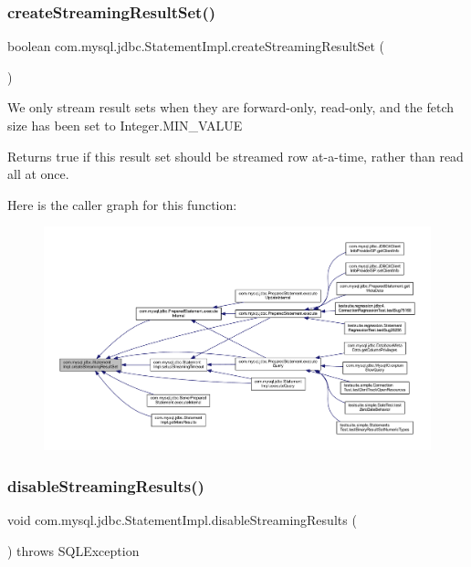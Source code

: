 \subsubsection{\texorpdfstring{create\+Streaming\+Result\+Set()}{createStreamingResultSet()}}
{\footnotesize\ttfamily boolean com.\+mysql.\+jdbc.\+Statement\+Impl.\+create\+Streaming\+Result\+Set (\begin{DoxyParamCaption}{ }\end{DoxyParamCaption})\hspace{0.3cm}{\ttfamily [protected]}}

We only stream result sets when they are forward-\/only, read-\/only, and the fetch size has been set to Integer.\+M\+I\+N\+\_\+\+V\+A\+L\+UE

\begin{DoxyReturn}{Returns}
true if this result set should be streamed row at-\/a-\/time, rather than read all at once. 
\end{DoxyReturn}
Here is the caller graph for this function\+:
\nopagebreak
\begin{figure}[H]
\begin{center}
\leavevmode
\includegraphics[width=350pt]{classcom_1_1mysql_1_1jdbc_1_1_statement_impl_a642ade7ecee90913b8de38602c43ce20_icgraph}
\end{center}
\end{figure}
\mbox{\label{classcom_1_1mysql_1_1jdbc_1_1_statement_impl_a1189cc8b7b69c3abdcee0cedb03298f5}} 
\subsubsection{\texorpdfstring{disable\+Streaming\+Results()}{disableStreamingResults()}}
{\footnotesize\ttfamily void com.\+mysql.\+jdbc.\+Statement\+Impl.\+disable\+Streaming\+Results (\begin{DoxyParamCaption}{ }\end{DoxyParamCaption}) throws S\+Q\+L\+Exception}

